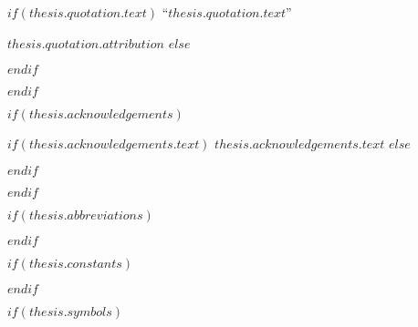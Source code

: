 \vspace*{0.2\textheight}

$if(thesis.quotation.text)$
\noindent``{\itshape $thesis.quotation.text$}''\bigbreak

\hfill $thesis.quotation.attribution$
$else$

$endif$

$endif$

$if(thesis.acknowledgements)$

\begin{acknowledgements}
\addchaptertocentry{\acknowledgementname} %
$if(thesis.acknowledgements.text)$
$thesis.acknowledgements.text$
$else$

$endif$
\end{acknowledgements}

$endif$


\begingroup
\hypersetup{linkcolor=$if(toclinkcolor)$$toclinkcolor$$else$black$endif$}

\tableofcontents %

\listoffigures %

\listoftables %

\endgroup


$if(thesis.abbreviations)$



$endif$

$if(thesis.constants)$



$endif$

$if(thesis.symbols)$

